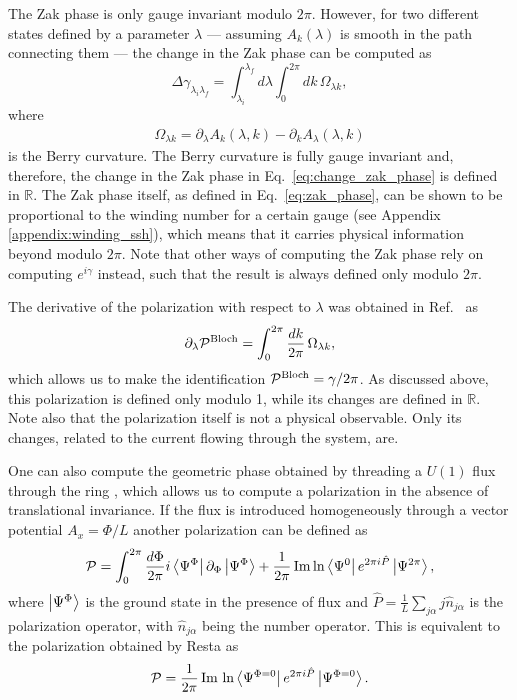 \documentclass[twocolumn,amsmath,longbibliography,amssymb,superscriptaddress]{revtex4-1}
\begin{document}
The Zak phase is only gauge invariant modulo $2\pi$. However, for two different states defined by a parameter $\lambda$ --- assuming $A_k(\lambda)$ is smooth in the path connecting them --- the change in the Zak phase can be computed as
\begin{equation}
\Delta {\gamma_{\lambda_i \lambda_f}} = \int_{\lambda_i}^{\lambda_f} d\lambda\int_{0}^{2\pi} dk \, \Omega_{\lambda k},
\label{eq:change_zak_phase}
\end{equation}
where 
\begin{align}\label{eq:BerryCurvature}
\Omega_{\lambda k} = \partial_\lambda A_k(\lambda,k) - \partial_k A_\lambda(\lambda,k)
\end{align}
 is the Berry curvature. The Berry curvature is fully gauge invariant and, therefore, the change in the Zak phase in Eq.~\eqref{eq:change_zak_phase} is defined in $\mathbb{R}$. %
The Zak phase itself, as defined in Eq.~\eqref{eq:zak_phase}, can be shown to be proportional to the winding number for a certain gauge (see Appendix \ref{appendix:winding_ssh}), which means that it carries physical information beyond modulo $2\pi$. Note that other ways of computing the Zak phase rely on computing $e^{i\gamma}$ instead, such that the result is always defined only modulo $2\pi$.

The derivative of the polarization with respect to $\lambda$ was obtained in Ref.~\cite{KingSmith1993} as
\begin{equation}\label{eq:Bloch_polarization}
\partial_\lambda \mathcal{P}^{\rm Bloch} = \int_{0}^{2\pi} \frac{dk}{2\pi} \, \Omega_{\lambda k},
\end{equation}
which allows us to make the identification $ \mathcal{P}^{\rm Bloch} = \gamma/2\pi$. 
As discussed above,  this polarization is defined only modulo 1, while its changes are  defined in $\mathbb{R}$. Note also that the polarization itself is not a physical observable. Only its changes, related to the current flowing through the system, are.

One can also compute the geometric phase obtained by threading a $U(1)$ flux through the ring \cite{Watanabe2018}, which allows us to compute a polarization in the absence of translational invariance. If the flux is introduced homogeneously through a vector potential $A_x = \Phi/L$ another polarization can be defined as
\begin{equation}\label{polarization_inhom}
\mathcal{P} = \int_0^{2\pi}\frac{d\Phi}{2\pi} i\bra{\Psi^\Phi}\partial_\Phi \ket{\Psi^\Phi} + \frac{1}{2\pi}\Im\ln \bra{\Psi^0}e^{2\pi i \hat{P}} \ket{\Psi^{2\pi}}, 
\end{equation}
where $\ket{\Psi^{\Phi}}$ is the ground state in the presence of flux and $\hat{P}=\frac{1}{L}\sum_{j\alpha} j\hat{n}_{j\alpha}$ is the polarization operator, with $\hat{n}_{j\alpha}$ being the number operator. This is equivalent to the polarization obtained by Resta \cite{Resta1997} as
\begin{align}
\mathcal{P} = \frac{1}{2\pi} \Im \,\ln\bra{\Psi^{\Phi=0}}e^{2\pi i \hat{P}}\ket{\Psi^{\Phi=0}}.
\label{eq:p_resta}
\end{align}
\end{document}
